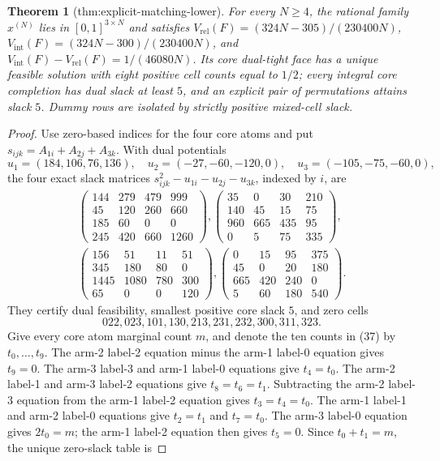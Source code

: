 \documentclass{article}
\newtheorem{theorem}{Theorem}
\begin{document}
\begin{theorem}[thm:explicit-matching-lower]\label{thm:explicit-matching-lower}
For every \(N\ge4\), the rational family \(x^{(N)}\) lies in \([0,1]^{3\times N}\) and satisfies \(V_{\mathrm{rel}}(F)=(324N-305)/(230400N)\), \(V_{\mathrm{int}}(F)=(324N-300)/(230400N)\), and \(V_{\mathrm{int}}(F)-V_{\mathrm{rel}}(F)=1/(46080N)\). Its core dual-tight face has a unique feasible solution with eight positive cell counts equal to \(1/2\); every integral core completion has dual slack at least \(5\), and an explicit pair of permutations attains slack \(5\). Dummy rows are isolated by strictly positive mixed-cell slack.
\end{theorem}
\begin{proof}
Use zero-based indices for the four core atoms and put \(s_{ijk}=A_{1i}+A_{2j}+A_{3k}\).  With dual potentials
\[
 u_1=(184,106,76,136),\quad u_2=(-27,-60,-120,0),\quad
 u_3=(-105,-75,-60,0),
\]
the four exact slack matrices \(s_{ijk}^2-u_{1i}-u_{2j}-u_{3k}\), indexed by \(i\), are
\[
\begin{gathered}
\begin{pmatrix}144&279&479&999\\45&120&260&660\\185&60&0&0\\245&420&660&1260\end{pmatrix},
\begin{pmatrix}35&0&30&210\\140&45&15&75\\960&665&435&95\\0&5&75&335\end{pmatrix},\\[2pt]
\begin{pmatrix}156&51&11&51\\345&180&80&0\\1445&1080&780&300\\65&0&0&120\end{pmatrix},
\begin{pmatrix}0&15&95&375\\45&0&20&180\\665&420&240&0\\5&60&180&540\end{pmatrix}.
\end{gathered} \tag{36}
\]
They certify dual feasibility, smallest positive core slack \(5\), and zero cells
\[
 022,023,101,130,213,231,232,300,311,323. \tag{37}
\]
Give every core atom marginal count \(m\), and denote the ten counts in (37) by \(t_0,\ldots,t_9\).  The arm-2 label-2 equation minus the arm-1 label-0 equation gives \(t_9=0\).  The arm-3 label-3 and arm-1 label-0 equations give \(t_4=t_0\).  The arm-2 label-1 and arm-3 label-2 equations give \(t_8=t_6=t_1\).  Subtracting the arm-2 label-3 equation from the arm-1 label-2 equation gives \(t_3=t_4=t_0\).  The arm-1 label-1 and arm-2 label-0 equations give \(t_2=t_1\) and \(t_7=t_0\).  The arm-3 label-0 equation gives \(2t_0=m\); the arm-1 label-2 equation then gives \(t_5=0\).  Since \(t_0+t_1=m\), the unique zero-slack table is

\end{proof}
\end{document}

